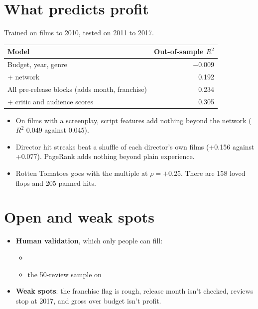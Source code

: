 \documentclass[10pt]{article}
\begin{document}
\section{What predicts profit }
Trained on films to 2010, tested on 2011 to 2017.

\begin{tabularx}{0.62\linewidth}{@{}Lr@{}}
\toprule
Model & Out-of-sample $R^2$ \\
\midrule
Budget, year, genre & $-0.009$ \\
+ network & 0.192 \\
All pre-release blocks (adds month, franchise) & 0.234 \\
+ critic and audience scores & 0.305 \\
\bottomrule
\end{tabularx}
\begin{itemize}
  \item On films with a screenplay, script features add nothing beyond the network ($R^2$ 0.049 against 0.045).
  \item Director hit streaks beat a shuffle of each director's own films (+0.156 against +0.077). PageRank adds nothing beyond plain experience.
  \item Rotten Tomatoes goes with the multiple at $\rho = +0.25$. There are 158 loved flops and 205 panned hits.
\end{itemize}

\section{Open and weak spots}
\begin{itemize}
  \item \textbf{Human validation}, which only people can fill:
  \begin{itemize}
    \item {}
    \item the 50-review sample on 
  \end{itemize}
  \item \textbf{Weak spots}: the franchise flag is rough, release month isn't checked, reviews stop at 2017, and gross over budget isn't profit.
\end{itemize}
\end{document}
